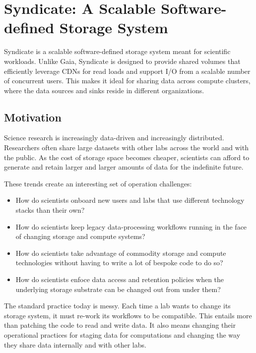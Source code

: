 \section{Syndicate: A Scalable Software-defined Storage System}

Syndicate is a scalable software-defined storage system meant for scientific
workloads.  Unlike Gaia, Syndicate is designed to provide shared volumes that
efficiently leverage CDNs for read loads and 
support I/O from a scalable number of concurrent users.  This makes
it ideal for sharing data across compute clusters, where the data sources and
sinks reside in different organizations.

\subsection{Motivation}

Science research is increasingly data-driven and increasingly distributed.
Researchers often share large datasets with other labs across the world and 
with the public.  As the cost of storage space becomes cheaper, scientists can
afford to generate and retain larger and larger amounts of data for the
indefinite future.

These trends create an interesting set of operation challenges:

\begin{itemize}
   \item How do scientists onboard new users and labs that use different
      technology stacks than their own?
   \item How do scientists keep legacy data-processing workflows running in the face
      of changing storage and compute systems?
   \item How do scientists take advantage of commodity storage and
      compute technologies without having to write a lot of bespoke code
      to do so?
   \item How do scientists enfoce data access and retention policies when the
      underlying storage substrate can be changed out from under them?
\end{itemize}

The standard practice today is messy.  Each time a lab wants to change its
storage system, it must re-work its workflows to be compatible.  This entails
more than patching the code to read and write data.  It also means changing their
operational practices for staging data for computations and changing the way they
share data internally and with other labs.

